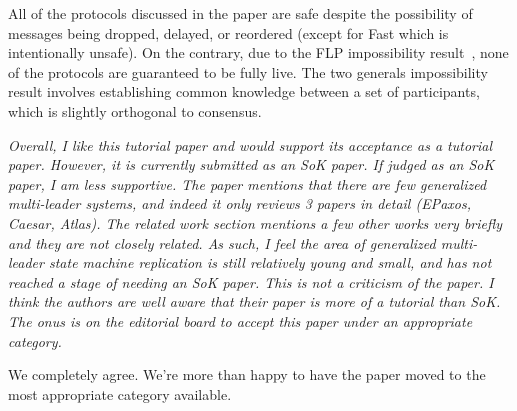 \documentclass[letterpaper,twocolumn,10pt]{article}
\newenvironment{reviewerquote}
{\list{}{\leftmargin=\parindent\rightmargin=0in}\item[] \itshape \color{ReviewerDarkGray}}%
{\endlist}
\begin{document}
All of the protocols discussed in the paper are safe despite the possibility of
messages being dropped, delayed, or reordered (except for Fast \BPaxos{} which
is intentionally unsafe). On the contrary, due to the FLP impossibility
result~\cite{fischer1982impossibility}, none of the protocols are guaranteed to
be fully live. The two generals impossibility result involves establishing
common knowledge between a set of participants, which is slightly orthogonal to
consensus.

\begin{reviewerquote}
  Overall, I like this tutorial paper and would support its acceptance as a
  tutorial paper. However, it is currently submitted as an SoK paper. If judged
  as an SoK paper, I am less supportive. The paper mentions that there are few
  generalized multi-leader systems, and indeed it only reviews 3 papers in
  detail (EPaxos, Caesar, Atlas). The related work section mentions a few other
  works very briefly and they are not closely related. As such, I feel the area
  of generalized multi-leader state machine replication is still relatively
  young and small, and has not reached a stage of needing an SoK paper. This is
  not a criticism of the paper. I think the authors are well aware that their
  paper is more of a tutorial than SoK. The onus is on the editorial board to
  accept this paper under an appropriate category.
\end{reviewerquote}

We completely agree. We're more than happy to have the paper moved to the most
appropriate category available.




\end{document}
